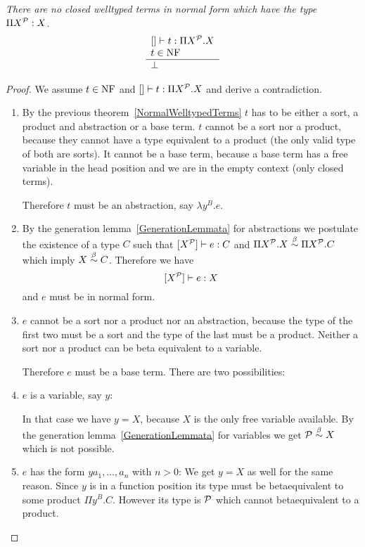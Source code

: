 \begin{theorem}
    \emph{There are no closed welltyped terms in normal form which have the
    type $\Pi X^{\cal P} : X$}.
    $$
    \begin{array}{l} 
        [] \vdash t: \Pi X^{\cal P}. X
        \\
        t \in \text{NF}
     \\ \hline \perp\end{array}
    $$

    \begin{proof}
        We assume $t \in \text{NF}$ and $[] \vdash t : \Pi X^{\cal P}. X$ and derive a
        contradiction.

        \begin{enumerate}
            \item By the previous theorem~\ref{NormalWelltypedTerms} $t$ has to
                be either a sort, a product and abstraction or a base term. $t$
                cannot be a sort nor a product, because they cannot have a type
                equivalent to a product (the only valid type of both are sorts).
                It cannot be a base term, because a base term has a free
                variable in the head position and we are in the empty context
                (only closed terms).

                Therefore $t$ must be an abstraction, say $\lambda y^B.e$.

            \item By the generation lemma~\ref{GenerationLemmata} for
                abstractions we postulate the existence of a type $C$ such
                that $[X^{\cal P}] \vdash e : C$ and $\Pi X^{\cal P}. X \stackrel{\beta}{\sim} \Pi
                X^{\cal P}.C$ which imply $X \stackrel{\beta}{\sim} C$. Therefore we have
                $$
                [X^{\cal P}] \vdash e : X
                $$ and $e$ must be in normal form.

            \item $e$ cannot be a sort nor a product nor an abstraction, because
                the type of the first two must be a sort and the type of the
                last must be a product. Neither a sort nor a product can be beta
                equivalent to a variable.

                Therefore $e$ must be a base term. There are two possibilities:

            \item $e$ is a variable, say $y$:

                In that case we have $y = X$, because $X$ is the only free
                variable available. By the generation
                lemma~\ref{GenerationLemmata} for variables we get ${\cal P}
                \stackrel{\beta}{\sim} X$ which is not possible.

            \item $e$ has the form $y a_1, \ldots, a_n$ with $n > 0$: We get $y
                = X$ as well for the same reason. Since $y$ is in a function
                position its type must be betaequivalent to some product $\Pi
                y^B.C$. However its type is ${\cal P}$ which cannot betaequivalent
                to a product.
        \end{enumerate}
    \end{proof}
\end{theorem}
